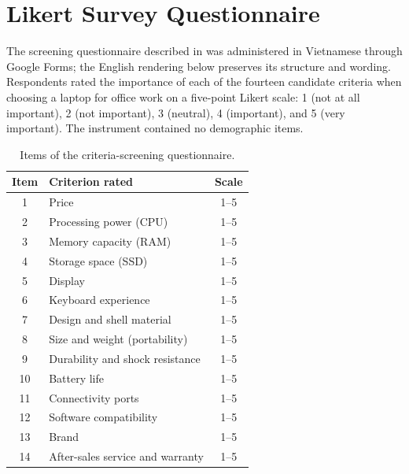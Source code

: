 \chapter{Likert Survey Questionnaire}\label{app:survey}

The screening questionnaire described in  was administered in
Vietnamese through Google Forms; the English rendering below preserves its structure and
wording. Respondents rated the importance of each of the fourteen candidate criteria when
choosing a laptop for office work on a five-point Likert scale: 1 (not at all important),
2 (not important), 3 (neutral), 4 (important), and 5 (very important). The instrument
contained no demographic items.

\begin{table}[htbp]
  \centering
  \caption{Items of the criteria-screening questionnaire.}
  \label{tab:questionnaire}
  \begin{tabular}{@{}clc@{}}
    \toprule
    \textbf{Item} & \textbf{Criterion rated} & \textbf{Scale} \\
    \midrule
    1  & Price                              & 1--5 \\
    2  & Processing power (CPU)             & 1--5 \\
    3  & Memory capacity (RAM)              & 1--5 \\
    4  & Storage space (SSD)                & 1--5 \\
    5  & Display                            & 1--5 \\
    6  & Keyboard experience                & 1--5 \\
    7  & Design and shell material          & 1--5 \\
    8  & Size and weight (portability)      & 1--5 \\
    9  & Durability and shock resistance    & 1--5 \\
    10 & Battery life                       & 1--5 \\
    11 & Connectivity ports                 & 1--5 \\
    12 & Software compatibility             & 1--5 \\
    13 & Brand                              & 1--5 \\
    14 & After-sales service and warranty   & 1--5 \\
    \bottomrule
  \end{tabular}
\end{table}
